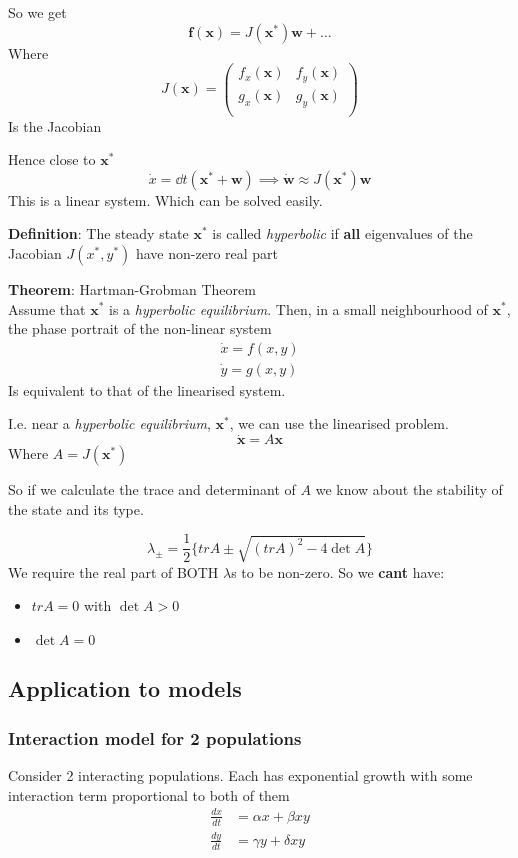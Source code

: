 \documentclass{/home/janmebows/Documents/LatexTemplates/myassignment}
\begin{document}
So we get
\[\mathbf{f}(\mathbf{x}) = J(\mathbf{x}^*)\mathbf{w} + \ldots\]
Where 
\[J(\mathbf{x}) = \begin{pmatrix}
    f_x(\mathbf{x})&f_y(\mathbf{x})\\
    g_x(\mathbf{x})&g_y(\mathbf{x})\\
\end{pmatrix}\]
Is the Jacobian

Hence close to $\mathbf{x}^*$
\[\dot x = \dd{}t(\mathbf{x}^* + \mathbf{w}) \implies \dot{\mathbf{w}} \approx J(\mathbf{x}^*)\mathbf{w}\]
This is a linear system. Which can be solved easily.


\textbf{Definition}:
The steady state $\mathbf{x}^*$ is called \textit{hyperbolic} if \textbf{all} eigenvalues of the Jacobian $J(x^*,y^*)$ have non-zero real part

\textbf{Theorem}: Hartman-Grobman Theorem\\
Assume that $\mathbf{x}^*$ is a \textit{hyperbolic equilibrium}. Then, in a small neighbourhood of $\mathbf{x}^*$, the phase portrait of the non-linear system
\begin{align*}
    \dot x = f(x,y)\\
    \dot y = g(x,y)
\end{align*}
Is equivalent to that of the linearised system.

I.e. near a \textit{hyperbolic equilibrium}, $\mathbf{x^*}$, we can use the linearised problem.
\[\dot{\mathbf{x}} = A \mathbf{x} \]
Where $A = J(\mathbf{x}^*)$

So if we calculate the trace and determinant of $A$ we know about the stability of the state and its type.

\[\lambda_\pm = \frac12 \{tr A \pm \sqrt{(tr A)^2 - 4\det A}\} \]
We require the real part of BOTH $\lambda$s to be non-zero. 
So we \textbf{cant} have:
\begin{itemize}
    \item  $tr A = 0$  with $\det A >0$
    \item $\det A = 0$ 
\end{itemize}


\subsection{Application to models}
\subsubsection{Interaction model for 2 populations}
Consider 2 interacting populations. Each has exponential growth with some interaction term proportional to both of them
\begin{align*}
    \frac{dx}{dt} &= \alpha x + \beta xy\\
    \frac{dy}{dt} &= \gamma y + \delta xy
\end{align*}
\end{document}
